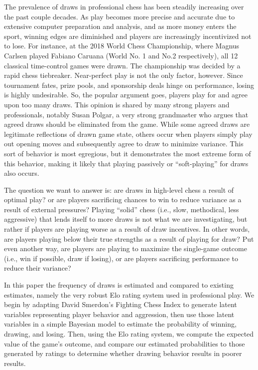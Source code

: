 \documentclass{article}
\begin{document}
The prevalence of draws in professional chess has been steadily increasing over the past couple decades.
As play becomes more precise and accurate due to extensive computer preparation and analysis,
and as more money enters the sport, winning edges are diminished and players are increasingly
incentivized not to lose.
For instance, at the 2018 World Chess Championship, where Magnus Carlsen played Fabiano Caruana (World No. 1 and No.2 respectively),
all 12 classical time-control games were drawn.
The championship was decided by a rapid chess tiebreaker.
Near-perfect play is not the only factor, however.
Since tournament fates, prize pools, and sponsorship deals hinge on performance, losing is highly undesirable.
So, the popular argument goes, players play for and agree upon too many draws. This opinion is shared by
many strong players and professionals, notably Susan Polgar, a very strong grandmaster who argues that agreed draws should be eliminated from the game.
While some agreed draws are legitimate reflections of drawn game state, others occur when players simply play out opening moves and subsequently agree to draw
to minimize variance. This sort of behavior is most egregious, but it demonstrates the most extreme form of this behavior, making it likely
that playing passively or ``soft-playing'' for draws also occurs.

The question we want to answer is: are draws in high-level chess a result of optimal play?
or are players sacrificing chances to win to reduce variance as a result of external pressures?
Playing ``solid'' chess (i.e., slow, methodical, less aggressive) that lends itself to more draws is not what we are investigating,
but rather if players are playing worse as a result of draw incentives. In other words, are players
playing below their true strengths as a result of playing for draw?
Put even another way, are players are playing to maximize the single-game outcome (i.e., win if possible, draw if losing),
or are players sacrificing performance to reduce their variance?

In this paper the frequency of draws is estimated and compared to existing estimates, namely the very robust Elo rating system used in professional play. We begin by adapting David Smerdon's Fighting Chess Index to generate latent variables representing player behavior and aggression,
then use those latent variables in a simple Bayesian model to estimate the probability of winning, drawing, and losing.
Then, using the Elo rating system, we compute the expected value of the game's outcome, and compare our estimated probabilities to those generated by ratings to determine whether drawing behavior results in poorer results.
\end{document}

